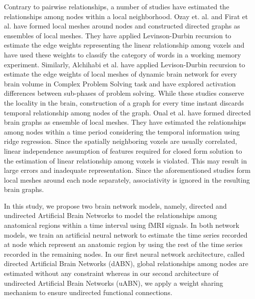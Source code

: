 \documentclass[runningheads]{llncs}
\begin{document}
Contrary to pairwise relationships, a number of studies have estimated the relationships among nodes within a local neighborhood. Ozay et. al. \cite{ozay2012mesh} and Firat et al. \cite{firat2013functional} have formed local meshes around nodes and constructed directed graphs as ensembles of local meshes. They have applied Levinson-Durbin recursion \cite{vaidyanathan2007theory} to estimate the edge weights representing the linear relationship among voxels and have used these weights to classify the category of words in a working memory experiment. Similarly, Alchihabi et al. \cite{alchihabi2018dynamic} have applied Levison-Durbin recursion to estimate the edge weights of local meshes of dynamic brain network for every brain volume in Complex Problem Solving task and have explored activation differences between sub-phases of problem solving. While these studies conserve the locality in the brain, construction of a graph for every time instant discards temporal relationship among nodes of the graph. Onal et al. \cite{onal2015modeling,onal2017new} have formed directed brain graphs as ensemble of local meshes. They have estimated the relationships among nodes within a time period considering the temporal information using ridge regression. Since the spatially neighboring voxels are usually correlated, linear independence assumption of features required for closed form solution to the estimation of linear relationship among voxels is violated. This  may result in large errors and inadequate representation. Since the aforementioned studies form local meshes around each node separately, associativity is ignored in the resulting brain graphs. 

In this study, we propose two brain network models, namely, directed and undirected Artificial Brain Networks to model the relationships among anatomical regions within a time interval using fMRI signals. In both network models, we train an artificial neural network to estimate the time series recorded at node which represent an anatomic region by using the rest of the time series recorded in the remaining nodes. In our first neural network architecture, called directed Artificial Brain Networks (dABN), global relationships among nodes are estimated without any constraint whereas in our second architecture of undirected Artificial Brain Networks (uABN), we apply a weight sharing mechanism to ensure undirected functional connections.
\end{document}
